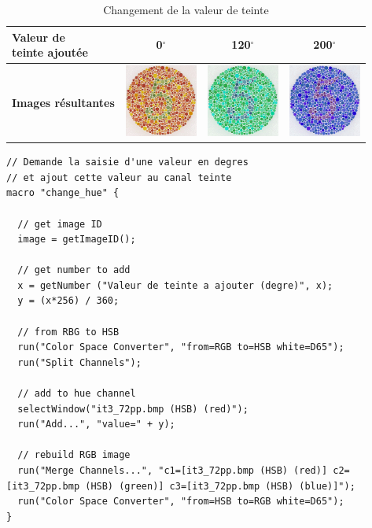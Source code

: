 \documentclass[a4paper,11pt]{article}
\begin{document}
\begin{table}[H]
  \begin{center}
  
    \begin{tabular}{|l||c|c|c|}
    
      \hline
      
      \bf \shortstack{ Valeur de \\ teinte ajoutée } &
      0$^{\circ}$ &
      120$^{\circ}$ &
      200$^{\circ}$ \\
      
      \hline
    
      \bf Images résultantes &
      \includegraphics[width=90px]{images/it3_72pp.png} & 
      \includegraphics[width=90px]{images/it3_120.png} & 
      \includegraphics[width=90px]{images/it3_200.png} \\
      
      \hline
    \end{tabular}
    
    \caption{Changement de la valeur de teinte}
    \label{tab:}
    
  \end{center}
\end{table}

\begin{lstlisting}[caption=change\_hue.ijm]
// Demande la saisie d'une valeur en degres
// et ajout cette valeur au canal teinte
macro "change_hue" {

  // get image ID
  image = getImageID();

  // get number to add
  x = getNumber ("Valeur de teinte a ajouter (degre)", x);
  y = (x*256) / 360;

  // from RBG to HSB
  run("Color Space Converter", "from=RGB to=HSB white=D65");
  run("Split Channels");

  // add to hue channel
  selectWindow("it3_72pp.bmp (HSB) (red)");
  run("Add...", "value=" + y);

  // rebuild RGB image
  run("Merge Channels...", "c1=[it3_72pp.bmp (HSB) (red)] c2=[it3_72pp.bmp (HSB) (green)] c3=[it3_72pp.bmp (HSB) (blue)]");
  run("Color Space Converter", "from=HSB to=RGB white=D65");
}
\end{lstlisting}
\end{document}
